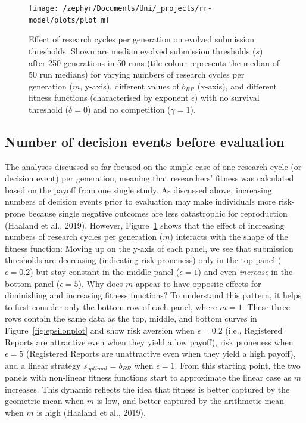 \documentclass[british,,man,mask,floatsintext]{apa6}
\begin{document}
\begin{figure}

{\centering \texttt{[image: /zephyr/Documents/Uni/\_projects/rr-model/plots/plot\_m]} 

}

\caption{Effect of research cycles per generation on evolved submission thresholds. Shown are median evolved submission thresholds (\(s\)) after 250 generations in 50 runs (tile colour represents the median of 50 run medians) for varying numbers of research cycles per generation (\(m\), y-axis), different values of \(b_{RR}\) (x-axis), and different fitness functions (characterised by exponent \(\epsilon\)) with no survival threshold (\(\delta = 0\)) and no competition (\(\gamma = 1\)).}\label{fig:mplot}
\end{figure}

\hypertarget{number-of-decision-events-before-evaluation-1}{%
\subsection{Number of decision events before evaluation}\label{number-of-decision-events-before-evaluation-1}}

The analyses discussed so far focused on the simple case of one research cycle (or decision event) per generation, meaning that researchers' fitness was calculated based on the payoff from one single study.
As discussed above, increasing numbers of decision events prior to evaluation may make individuals more risk-prone because single negative outcomes are less catastrophic for reproduction (Haaland et al., 2019).
However, Figure~\ref{fig:mplot} shows that the effect of increasing numbers of research cycles per generation (\(m\)) interacts with the shape of the fitness function:
Moving up on the y-axis of each panel, we see that submission thresholds are decreasing (indicating risk proneness) only in the top panel (\(\epsilon = 0.2\)) but stay constant in the middle panel (\(\epsilon = 1\)) and even \emph{increase} in the bottom panel (\(\epsilon = 5\)).
Why does \(m\) appear to have opposite effects for diminishing and increasing fitness functions?
To understand this pattern, it helps to first consider only the bottom row of each panel, where \(m = 1\).
These three rows contain the same data as the top, middle, and bottom curves in Figure~\ref{fig:epsilonplot} and show risk aversion when \(\epsilon = 0.2\) (i.e., Registered Reports are attractive even when they yield a low payoff), risk proneness when \(\epsilon = 5\) (Registered Reports are unattractive even when they yield a high payoff), and a linear strategy \(s_{optimal} = b_{RR}\) when \(\epsilon = 1\).
From this starting point, the two panels with non-linear fitness functions start to approximate the linear case as \(m\) increases.
This dynamic reflects the idea that fitness is better captured by the geometric mean when \(m\) is low, and better captured by the arithmetic mean when \(m\) is high (Haaland et al., 2019).
\end{document}
